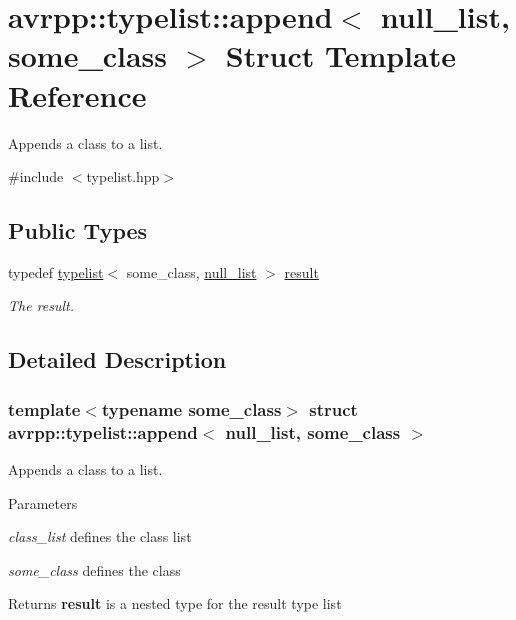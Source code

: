 \hypertarget{structavrpp_1_1typelist_1_1append_3_01null__list_00_01some__class_01_4}{
\section{avrpp::typelist::append$<$ null\_\-list, some\_\-class $>$ Struct Template Reference}
\label{structavrpp_1_1typelist_1_1append_3_01null__list_00_01some__class_01_4}
}


Appends a class to a list.  




{\ttfamily \#include $<$typelist.hpp$>$}

\subsection*{Public Types}
\begin{DoxyCompactItemize}
\item 
typedef \hyperlink{structavrpp_1_1typelist_1_1typelist}{typelist}$<$ some\_\-class, \hyperlink{structavrpp_1_1typelist_1_1null__list}{null\_\-list} $>$ \hyperlink{structavrpp_1_1typelist_1_1append_3_01null__list_00_01some__class_01_4_a22b468f1cf76b305fe9dd5665e8d5d13}{result}
\begin{DoxyCompactList}\small\item\em The result. \item\end{DoxyCompactList}\end{DoxyCompactItemize}


\subsection{Detailed Description}
\subsubsection*{template$<$typename some\_\-class$>$ struct avrpp::typelist::append$<$ null\_\-list, some\_\-class $>$}

Appends a class to a list. 
\begin{DoxyParams}{Parameters}
\item[{\em class\_\-list}]defines the class list \item[{\em some\_\-class}]defines the class \end{DoxyParams}
\begin{DoxyReturn}{Returns}
{\bfseries result} is a nested type for the result type list 
\end{DoxyReturn}


